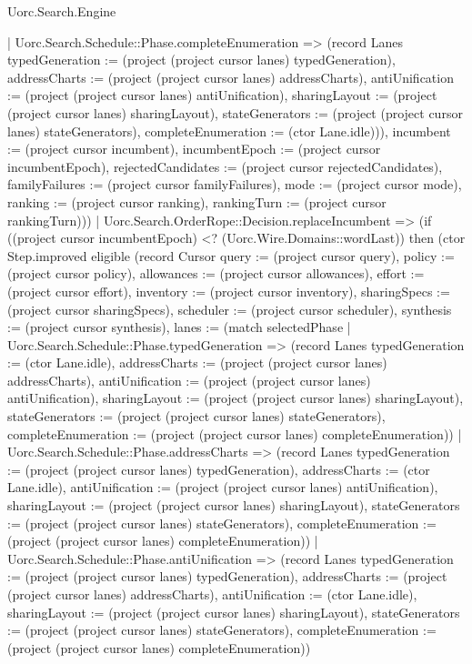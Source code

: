 \begin{lexlean}{Uorc.Search.Engine}
\begin{semanticmodule}
{{          | Uorc.Search.Schedule::Phase.completeEnumeration => (record Lanes {typedGeneration := (project (project cursor lanes) typedGeneration), addressCharts := (project (project cursor lanes) addressCharts), antiUnification := (project (project cursor lanes) antiUnification), sharingLayout := (project (project cursor lanes) sharingLayout), stateGenerators := (project (project cursor lanes) stateGenerators), completeEnumeration := (ctor Lane.idle)})), incumbent := (project cursor incumbent), incumbentEpoch := (project cursor incumbentEpoch), rejectedCandidates := (project cursor rejectedCandidates), familyFailures := (project cursor familyFailures), mode := (project cursor mode), ranking := (project cursor ranking), rankingTurn := (project cursor rankingTurn)}))
        | Uorc.Search.OrderRope::Decision.replaceIncumbent => (if ((project cursor incumbentEpoch) <? (Uorc.Wire.Domains::wordLast)) then (ctor Step.improved eligible (record Cursor {query := (project cursor query), policy := (project cursor policy), allowances := (project cursor allowances), effort := (project cursor effort), inventory := (project cursor inventory), sharingSpecs := (project cursor sharingSpecs), scheduler := (project cursor scheduler), synthesis := (project cursor synthesis), lanes := (match selectedPhase
          | Uorc.Search.Schedule::Phase.typedGeneration => (record Lanes {typedGeneration := (ctor Lane.idle), addressCharts := (project (project cursor lanes) addressCharts), antiUnification := (project (project cursor lanes) antiUnification), sharingLayout := (project (project cursor lanes) sharingLayout), stateGenerators := (project (project cursor lanes) stateGenerators), completeEnumeration := (project (project cursor lanes) completeEnumeration)})
          | Uorc.Search.Schedule::Phase.addressCharts => (record Lanes {typedGeneration := (project (project cursor lanes) typedGeneration), addressCharts := (ctor Lane.idle), antiUnification := (project (project cursor lanes) antiUnification), sharingLayout := (project (project cursor lanes) sharingLayout), stateGenerators := (project (project cursor lanes) stateGenerators), completeEnumeration := (project (project cursor lanes) completeEnumeration)})
          | Uorc.Search.Schedule::Phase.antiUnification => (record Lanes {typedGeneration := (project (project cursor lanes) typedGeneration), addressCharts := (project (project cursor lanes) addressCharts), antiUnification := (ctor Lane.idle), sharingLayout := (project (project cursor lanes) sharingLayout), stateGenerators := (project (project cursor lanes) stateGenerators), completeEnumeration := (project (project cursor lanes) completeEnumeration)})
}}
\end{semanticmodule}
\end{lexlean}
